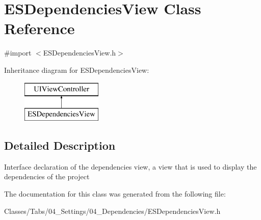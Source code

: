 \hypertarget{interface_e_s_dependencies_view}{}\section{E\+S\+Dependencies\+View Class Reference}
\label{interface_e_s_dependencies_view}


{\ttfamily \#import $<$E\+S\+Dependencies\+View.\+h$>$}

Inheritance diagram for E\+S\+Dependencies\+View\+:\begin{figure}[H]
\begin{center}
\leavevmode
\includegraphics[height=2.000000cm]{interface_e_s_dependencies_view}
\end{center}
\end{figure}


\subsection{Detailed Description}
Interface declaration of the dependencies view, a view that is used to display the dependencies of the project 

The documentation for this class was generated from the following file\+:\begin{DoxyCompactItemize}
\item 
Classes/\+Tabs/04\+\_\+\+Settings/04\+\_\+\+Dependencies/E\+S\+Dependencies\+View.\+h\end{DoxyCompactItemize}
